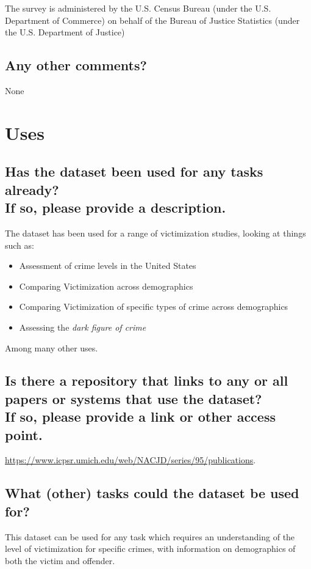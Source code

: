 \documentclass[letterpaper, 10 pt, conference]{ieeeconf}  %
\newcommand{\subtitle}[1]{{\\ \small \normalfont \color{purple} #1}}
\begin{document}
The survey is administered by the U.S. Census Bureau (under the U.S. Department of Commerce) on behalf of the Bureau of Justice Statistics (under the U.S. Department of Justice)

\subsection{Any other comments?}

None

\section{Uses}

\subsection{Has the dataset been used for any tasks already? \subtitle{If so, please provide a description.}}

The dataset has been used for a range of victimization studies, looking at things such as:

\begin{itemize}
    \item Assessment of crime levels in the United States 
    \item Comparing Victimization across demographics
    \item Comparing Victimization of specific types of crime across demographics
    \item Assessing the \textit{dark figure of crime}
\end{itemize}

Among many other uses.

\subsection{Is there a repository that links to any or all papers or systems that use the dataset? \subtitle{If so, please provide a link or other access point. }}

\href{https://www.icpsr.umich.edu/web/NACJD/series/95/publications}{https://www.icpsr.umich.edu/web/NACJD/series/95/publications}.

\subsection{What (other) tasks could the dataset be used for?}

This dataset can be used for any task which requires an understanding of the level of victimization for specific crimes, with information on demographics of both the victim and offender.
\end{document}
